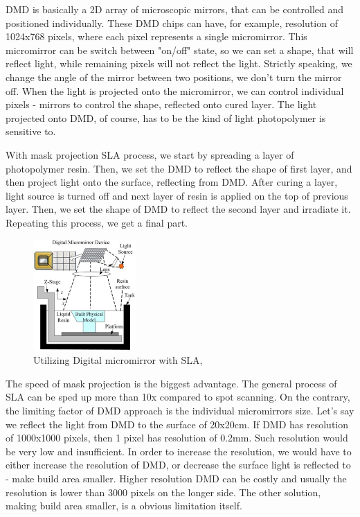 \documentclass[a4paper, 11pt, reqno]{report}
\begin{document}
	DMD is basically a 2D array of microscopic mirrors, that can be controlled and positioned individually. These DMD chips can have, for example, resolution of 1024x768 pixels, where each pixel represents a single micromirror. This micromirror can be switch between "on/off" state, so we can set a shape, that will reflect light, while remaining pixels will not reflect the light. Strictly speaking, we change the angle of the mirror between two positions, we don't turn the mirror off. When the light is projected onto the micromirror, we can control individual pixels - mirrors to control the shape, reflected onto cured layer. The light projected onto DMD, of course, has to be the kind of light photopolymer is sensitive to.
	
	With mask projection SLA process, we start by spreading a layer of photopolymer resin. Then, we set the DMD to reflect the shape of first layer, and then project light onto the surface, reflecting from DMD. After curing a layer, light source is turned off and next layer of resin is applied on the top of previous layer. Then, we set the shape of DMD to reflect the second layer and irradiate it. Repeating this process, we get a final part.\\
%
\begin{figure}
 	\includegraphics[width=0.35\textwidth, angle=0]{DMD}
	\caption{Utilizing Digital micromirror with SLA, \cite{manufacturingScience}}
\end{figure}
%
The speed of mask projection is the biggest advantage. The general process of SLA can be sped up more than 10x compared to spot scanning. On the contrary, the limiting factor of DMD approach is the individual micromirrors size. Let's say we reflect the light from DMD to the surface of 20x20cm. If DMD has resolution of 1000x1000 pixels, then 1 pixel has resolution of 0.2mm. Such resolution would be very low and insufficient. In order to increase the resolution, we would have to either increase the resolution of DMD, or decrease the surface light is reflected to - make build area smaller. Higher resolution DMD can be costly and usually the resolution is lower than 3000 pixels on the longer side. The other solution, making build area smaller, is a obvious limitation itself.
\end{document}
